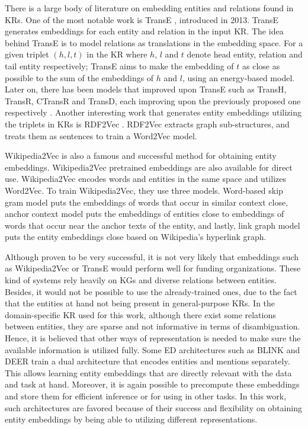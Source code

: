 \documentclass{report}
\theoremstyle{definition}
\theoremstyle{remark}
\begin{document}
There is a large body of literature on embedding entities and relations found in KRs. One of the most notable work is TransE \cite{TransE}, introduced in 2013. TransE generates embeddings for each entity and relation in the input KR. The idea behind TransE is to model relations as translations in the embedding space. For a given triplet $(h,l,t)$ in the KR where $h$, $l$ and $t$ denote head entity, relation and tail entity respectively; TransE aims to make the embedding of $t$ as close as possible to the sum of the embeddings of $h$ and $l$, using an energy-based model. Later on, there has been models that improved upon TransE such as TransH, TransR, CTransR and TransD, each improving upon the previously proposed one respectively  \cite{TransEimproved}. Another interesting work that generates entity embeddings utilizing the triplets in KRs is RDF2Vec \cite{RDF2Vec}. RDF2Vec extracts graph sub-structures, and treats them as sentences to train a Word2Vec model. 

Wikipedia2Vec \cite{wikipedia2vec2} is also a famous and successful method for obtaining entity embeddings. Wikipedia2Vec pretrained embeddings are also available for direct use. Wikipedia2Vec encodes words and entities in the same space and utilizes Word2Vec. To train Wikipedia2Vec, they use three models. Word-based skip gram model puts the embeddings of words that occur in similar context close, anchor context model puts the embeddings of entities close to embeddings of words that occur near the anchor texts of the entity, and lastly, link graph model puts the entity embeddings close based on Wikipedia's hyperlink graph. 

Although proven to be very successful, it is not very likely that embeddings such as Wikipedia2Vec or TransE would perform well for funding organizations. These kind of systems rely heavily on KGs and diverse relations between entities. Besides, it would not be possible to use the already-trained ones, due to the fact that the entities at hand not being present in general-purpose KRs. In the domain-specific KR used for this work, although there exist some relations between entities, they are sparse and not informative in terms of disambiguation. Hence, it is believed that other ways of representation is needed to make sure the available information is utilized fully. Some ED architectures such as BLINK and DEER train a dual architecture that encodes entities and mentions separately. This allows learning entity embeddings that are directly relevant with the data and task at hand. Moreover, it is again possible to precompute these embeddings and store them for efficient inference or for using in other tasks. In this work, such architectures are favored because of their success and flexibility on obtaining entity embeddings by being able to utilizing different representations.
\end{document}

